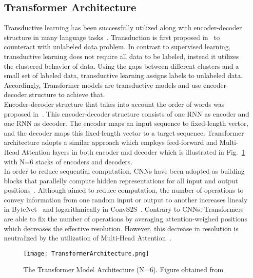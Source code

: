 \subsection{Transformer Architecture}
\label{subsec:newsContentModels_TransformerArch}
Transductive learning has been successfully utilized along with encoder-decoder structure in many language
tasks~\parencite{S2SLearningWithNNs_Sutskever, LearningPhraseRepresentations_Cho, AttentionIsAllYouNeed_Vaswani}. Transduction is first proposed in~\cite{LearningByTransduction_Gammerman} to counteract with unlabeled data problem.
In contrast to supervised learning, transductive learning does not require all data to be labeled, instead it utilizes
the clustered behavior of data. Using the gaps between different clusters and a small set of labeled data, transductive learning assigns labels to unlabeled data. Accordingly, Transformer models are transductive models and use encoder-decoder structure to achieve that.\\
Encoder-decoder structure that takes into account the order of words was proposed in~\parencite{LearningPhraseRepresentations_Cho}. This encoder-decoder structure consists of one RNN as encoder and one RNN as decoder. The encoder maps an input sequence to fixed-length vector, and the decoder maps this fixed-length vector to a target sequence. Transformer architecture adopts a similar approach which employs feed-forward and Multi-Head Attention layers in both encoder and decoder which is illustrated in Fig.~\ref{fig:transformerArchitecture} with N=6 stacks of encoders and decoders.\\
In order to reduce sequential computation, CNNs have been adopted as building blocks that parallelly compute hidden representations for all input and output positions~\parencite{AttentionIsAllYouNeed_Vaswani}. Although aimed to reduce computation, the number of operations to convey information from one random input or output to another increases linealy in ByteNet~\parencite{ByteNet_Kalchbrenner} and logarithmically in ConvS2S~\parencite{ConvS2S_Gehring}. Contrary to CNNs, Transformers are able to fix the number of operations by averaging attention-weighed positions which decreases the effective resolution. However, this decrease in resolution is neutralized by the utilization of Multi-Head Attention~\parencite{AttentionIsAllYouNeed_Vaswani}.
\begin{figure}
    \centering
    \texttt{[image: TransformerArchitecture.png]}
    \caption[The Transformer Model Architecture]{The Transformer Model Architecture (N=6). Figure obtained from~\parencite{AttentionIsAllYouNeed_Vaswani}}
    \label{fig:transformerArchitecture}
\end{figure}
